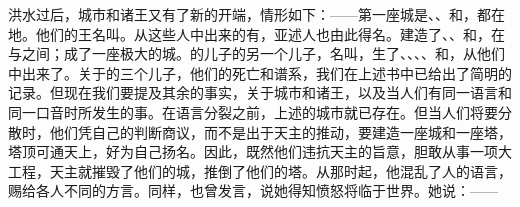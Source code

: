 洪水过后，城市和诸王又有了新的开端，情形如下：——第一座城是、、和，都在地。他们的王名叫。从这些人中出来的有，亚述人也由此得名。建造了、、和，在与之间；成了一座极大的城。的儿子的另一个儿子，名叫，生了、、、、和，从他们中出来了。关于的三个儿子，他们的死亡和谱系，我们在上述书中已给出了简明的记录。但现在我们要提及其余的事实，关于城市和诸王，以及当人们有同一语言和同一口音时所发生的事。在语言分裂之前，上述的城市就已存在。但当人们将要分散时，他们凭自己的判断商议，而不是出于天主的推动，要建造一座城和一座塔，塔顶可通天上，好为自己扬名。因此，既然他们违抗天主的旨意，胆敢从事一项大工程，天主就摧毁了他们的城，推倒了他们的塔。从那时起，他混乱了人的语言，赐给各人不同的方言。同样，也曾发言，说她得知愤怒将临于世界。她说：——\par

\par

